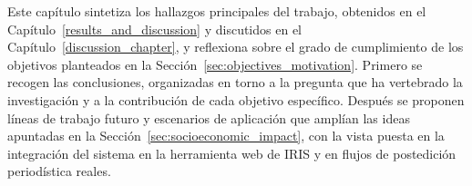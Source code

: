 
Este capítulo sintetiza los hallazgos principales del trabajo, obtenidos en el
Capítulo~\ref{results_and_discussion} y discutidos en el Capítulo~\ref{discussion_chapter}, y reflexiona sobre el grado de
cumplimiento de los objetivos planteados en la Sección~\ref{sec:objectives_motivation}.
Primero se recogen las conclusiones, organizadas en torno a la pregunta que ha
vertebrado la investigación y a la contribución de cada objetivo específico. Después
se proponen líneas de trabajo futuro y escenarios de aplicación que amplían las ideas
apuntadas en la Sección~\ref{sec:socioeconomic_impact}, con la vista puesta en la
integración del sistema en la herramienta web de IRIS y en flujos de postedición periodística
reales.

